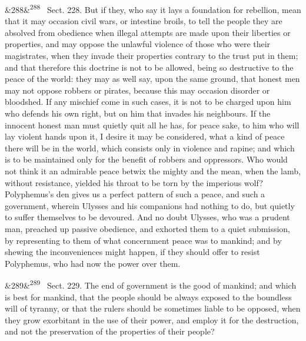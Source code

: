\documentclass[12pt]{article}
\newcommand{\para}[1][]{\par\noindent\ifx&#1&\else\textsuperscript{\footnotesize #1}~\fi}
\begin{document}
\para[288] Sect. 228. But if they, who say it lays a foundation for rebellion, mean that it may occasion civil wars, or intestine broils, to tell the people they are absolved from obedience when illegal attempts are made upon their liberties or properties, and may oppose the unlawful violence of those who were their magistrates, when they invade their properties contrary to the trust put in them; and that therefore this doctrine is not to be allowed, being so destructive to the peace of the world: they may as well say, upon the same ground, that honest men may not oppose robbers or pirates, because this may occasion disorder or bloodshed. If any mischief come in such cases, it is not to be charged upon him who defends his own right, but on him that invades his neighbours. If the innocent honest man must quietly quit all he has, for peace sake, to him who will lay violent hands upon it, I desire it may be considered, what a kind of peace there will be in the world, which consists only in violence and rapine; and which is to be maintained only for the benefit of robbers and oppressors. Who would not think it an admirable peace betwix the mighty and the mean, when the lamb, without resistance, yielded his throat to be torn by the imperious wolf? Polyphemus's den gives us a perfect pattern of such a peace, and such a government, wherein Ulysses and his companions had nothing to do, but quietly to suffer themselves to be devoured. And no doubt Ulysses, who was a prudent man, preached up passive obedience, and exhorted them to a quiet submission, by representing to them of what concernment peace was to mankind; and by shewing the inconveniences might happen, if they should offer to resist Polyphemus, who had now the power over them.

\para[289] Sect. 229. The end of government is the good of mankind; and which is best for mankind, that the people should be always exposed to the boundless will of tyranny, or that the rulers should be sometimes liable to be opposed, when they grow exorbitant in the use of their power, and employ it for the destruction, and not the preservation of the properties of their people?
\end{document}
